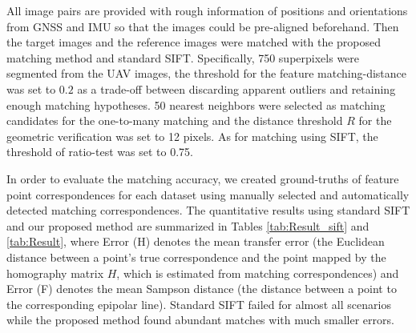 All image pairs are provided with rough information of positions and orientations from GNSS and IMU so that the images could be pre-aligned beforehand.
Then the target images and the reference images were matched with the proposed matching method and standard SIFT. 
Specifically, 750 superpixels were segmented from the UAV images, the threshold for the feature matching-distance was set to $0.2$ as a trade-off between discarding apparent outliers and retaining enough matching hypotheses.
50 nearest neighbors were selected as matching candidates for the one-to-many matching and the distance threshold $R$ for the geometric verification was set to 12 pixels.
As for matching using SIFT, the threshold of ratio-test was set to 0.75.

In order to evaluate the matching accuracy, we created ground-truths of feature point correspondences for each dataset using manually selected and automatically detected matching correspondences. 
The quantitative results using standard SIFT and our proposed method are summarized in Tables \ref{tab:Result_sift} and \ref{tab:Result}, where Error (H) denotes the mean transfer error (the Euclidean distance between a point's true correspondence and the point mapped by the homography matrix $H$, which is estimated from matching correspondences) and Error (F) denotes the mean Sampson distance (the distance between a point to the corresponding epipolar line). 
Standard SIFT failed for almost all scenarios while the proposed method found abundant matches with much smaller errors. 

